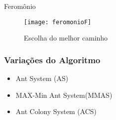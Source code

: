 \documentclass[compress]{beamer}
\begin{document}
\begin{frame}{Feromônio}
\begin{figure}[!htb]
    \centering
    \texttt{[image: feromonioF]}
    \caption{Escolha do melhor caminho}
\end{figure}
\end{frame}







 

\begin{frame}
\frametitle{Variações do Algoritmo}

\begin{itemize}
  \item Ant System (AS)
  \item MAX-Min Ant System(MMAS)
  \item Ant Colony System (ACS)
\end{itemize}
\end{frame}
\end{document}
